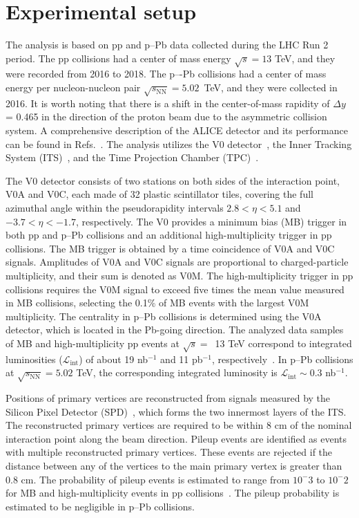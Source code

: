 

\section{Experimental setup}
\label{sec:experiment}

The analysis is based on pp and p--Pb data collected during the LHC Run 2 period. The pp collisions had a center of mass energy $\sqrt{s} = 13$ TeV, and they were recorded from 2016 to 2018.
The p–-Pb collisions had a center of mass energy per nucleon-nucleon pair $\sqrt{s_\mathrm{NN}} = 5.02$~TeV, and they were collected in 2016. It is worth noting that there is a shift in the center-of-mass rapidity of $\Delta y$ = 0.465 in the direction of the proton beam due to the asymmetric collision system.
A comprehensive description of the ALICE detector and its performance can be found in Refs.~\cite{Aamodt:2008zz, Abelev:2014ffa, ALICE:2022wpn}. The analysis utilizes the V0 detector~\cite{Abbas:2013taa}, the Inner Tracking System (ITS)~\cite{aliceITS, ALICE:2013nwm}, and the Time Projection Chamber (TPC)~\cite{aliceTPC}. 

The V0 detector consists of two stations on both sides of the interaction point, V0A and V0C, each made of 32 plastic scintillator tiles, covering the full azimuthal angle within the pseudorapidity intervals $2.8 < \eta < 5.1$ and $-3.7 < \eta < -1.7$, respectively. The V0 provides a minimum bias (MB) trigger in both pp and p--Pb collisions and an additional high-multiplicity trigger in pp collisions. The MB trigger is obtained by a time coincidence of V0A and V0C signals. 
Amplitudes of V0A and V0C signals are proportional to charged-particle multiplicity, and their sum is denoted as V0M.  
The high-multiplicity trigger in pp collisions requires the V0M signal to exceed five times the mean value measured in MB collisions, selecting the 0.1\% of MB events with the largest V0M multiplicity. The centrality in p--Pb collisions is determined using the V0A detector, which is located in the Pb-going direction. The analyzed data samples of MB and high-multiplicity pp events at $\sqrt{s}=$~13 TeV correspond to integrated luminosities ($\mathcal{L}_\mathrm{int}$) of about 19 nb$^{-1}$ and 11 pb$^{-1}$, respectively~\cite{ALICE:2016nst}. In p--Pb collisions at $\sqrt{s_\mathrm{NN}} = 5.02$ TeV, the corresponding integrated luminosity is $\mathcal{L}_\mathrm{int} \sim 0.3$ nb$^{-1}$. 

Positions of primary vertices are reconstructed from signals measured by the Silicon Pixel Detector (SPD)~\cite{Santoro2009:ALICESPD}, which forms the two innermost layers of the ITS. The reconstructed primary vertices are required to be within 8 cm of the nominal interaction point along the beam direction. 
Pileup events are identified as events with multiple reconstructed primary vertices. These events are rejected if the distance between any of the vertices to the main primary vertex is greater than 0.8 cm.
The probability of pileup events is estimated to range from $10^-3$ to $10^-2$ for MB and high-multiplicity events in pp collisions~\cite{ALICE:2020swj}. The pileup probability is estimated to be negligible in p--Pb collisions. 

